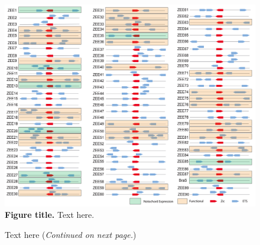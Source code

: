 \begin{figure}[h]
    \centering
    \includegraphics[scale=.2]{1_figures-and-files/FigS1_ZEE-Library.png}
    \caption[Figure title]{\textbf{Figure title.} Text here.}
    \label{fig:supplement tag for table of contents}
\end{figure}


\begin{figure}[p]
    \centering
    \caption[Figure title]{Text here (\textit{Continued on next page.})}
    \label{fig:supplement tag2 for table of contents}
\end{figure}

\addtocounter{figure}{-1}

